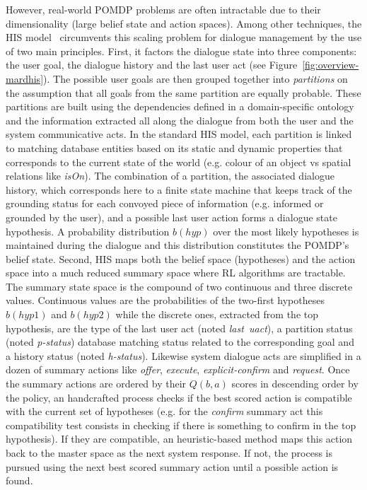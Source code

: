 \documentclass[a4paper,11pt,twoside]{StyleThese}
\begin{document}
However, real-world POMDP problems are often intractable due to their dimensionality (large belief state and action spaces). Among other techniques, the HIS model~\cite{Young10} circumvents this scaling problem for dialogue management by the use of two main principles. First, it factors the dialogue state into three components: the user goal, the dialogue history and the last user act (see Figure~\ref{fig:overview-mardhis}). The possible user goals are then grouped together into \textit{partitions} on the assumption that all goals from the same partition are equally probable. These partitions are built using the dependencies defined in a domain-specific ontology and the information extracted all along the dialogue from both the user and the system communicative acts. In the standard HIS model, each partition is linked to matching database entities based on its static and dynamic properties that corresponds to the current state of the world (e.g. colour of an object vs spatial relations like \textit{isOn}).
The combination of a partition, the associated dialogue history, which corresponds here to a finite state machine that keeps track of the grounding status for each convoyed piece of information (e.g. informed or grounded by the user), and a possible last user action forms a dialogue state hypothesis. A probability distribution $b(hyp)$ over the most likely hypotheses is maintained during the dialogue and this distribution constitutes the POMDP's belief state.
Second, HIS maps both the belief space (hypotheses) and the action space into a much reduced summary space where RL algorithms are tractable.
The summary state space is the compound of two continuous and three discrete values. Continuous values are the probabilities of the two-first hypotheses $b(hyp1)$ and $b(hyp2)$ while the discrete ones, extracted from the top hypothesis, are the type of the last user act (noted \textit{last\ uact}), a partition status (noted \textit{p-status}) database matching status related to the corresponding goal and a history status (noted \textit{h-status}).
Likewise system dialogue acts are simplified in a dozen of summary actions like \textit{offer}, \textit{execute}, \textit{explicit-confirm} and \textit{request}. Once the summary actions are ordered by their $Q(b,a)$ scores in descending order by the policy, an handcrafted process checks if the best scored action is compatible with the current set of hypotheses (e.g. for the \textit{confirm} summary act this compatibility test consists in checking if there is something to confirm in the top hypothesis). If they are compatible, an heuristic-based method maps this action back to the master space as the next system response. If not, the process is pursued using the next best scored summary action until a possible action is found.
\end{document}
